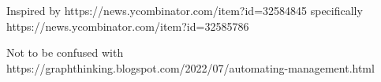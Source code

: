Inspired by https://news.ycombinator.com/item?id=32584845
specifically https://news.ycombinator.com/item?id=32585786 

Not to be confused with https://graphthinking.blogspot.com/2022/07/automating-management.html 

